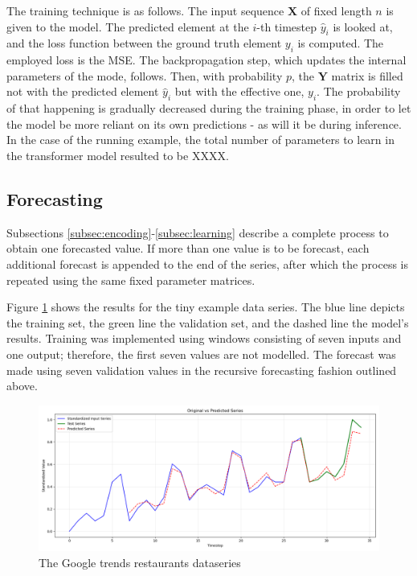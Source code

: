 \documentclass[algorithms,article,submit,pdftex,moreauthors]{Definitions/mdpi}
\begin{document}
The training technique is as follows. The input sequence $\textbf{X}$ of fixed length $n$ is given to the model. The predicted element at the $i$-th timestep $\hat y_i$ is looked at, and the loss function between the ground truth element $y_i$ is computed. The employed loss is the MSE. The backpropagation step, which updates the internal parameters of the mode, follows. Then, with probability $p$, the $\textbf{Y}$ matrix is filled not with the predicted element $\hat y_i$ but with the effective one, $y_i$. The probability of that happening is gradually decreased during the training phase, in order to let the model be more reliant on its own predictions - as will it be during inference. In the case of the running example, the total number of parameters to learn in the transformer model resulted to be XXXX.


\subsection{Forecasting} \label{subsec:forecasting}

Subsections \ref{subsec:encoding}-\ref{subsec:learning} describe a complete process to obtain one forecasted value. If more than one value is to be forecast, each additional forecast is appended to the end of the series, after which the process is repeated using the same fixed parameter matrices.

Figure \ref{fig:restaurants} shows the results for the tiny example data series. The blue line depicts the training set, the green line the validation set, and the dashed line the model's results. Training was implemented using windows consisting of seven inputs and one output; therefore, the first seven values are not modelled. The forecast was made using seven validation values in the recursive forecasting fashion outlined above.

\begin{figure}
    \centering
    \includegraphics[width=0.95\linewidth]{restaurants.png}
    \caption{The Google trends restaurants dataseries}
    \label{fig:restaurants}
\end{figure}
\end{document}
